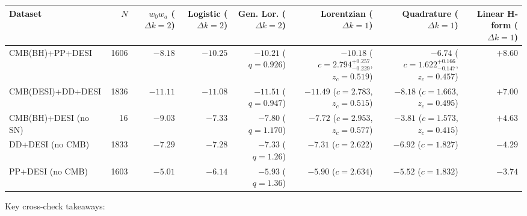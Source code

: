 \documentclass[11pt,a4paper]{article}
\begin{document}
\begin{center}
\begin{adjustbox}{max width=\linewidth}
\begin{tabular}{lrrrrrrr}
\hline
{}{\bfseries\boldmath Dataset} & {\bfseries\boldmath $N$} & {\bfseries\boldmath $w_0 w_a$ ($\Delta k=2$)} & {\bfseries\boldmath Logistic ($\Delta k=2$)} & {\bfseries\boldmath Gen. Lor. ($\Delta k=2$)} & {\bfseries\boldmath Lorentzian ($\Delta k=1$)} & {\bfseries\boldmath Quadrature ($\Delta k=1$)} & {\bfseries\boldmath Linear H-form ($\Delta k=1$)} \\
\hline
{}CMB(BH)+PP+DESI & 1606 & $-8.18$ & $-10.25$ & $-10.21$ ($q=0.926$) & $-10.18$ ($c=2.794^{+0.257}_{-0.229}$, $z_c=0.519$) & $-6.74$ ($c=1.622^{+0.166}_{-0.147}$, $z_c=0.457$) & $+8.60$ \\
{}CMB(DESI)+DD+DESI & 1836 & $-11.11$ & $-11.08$ & $-11.51$ ($q=0.947$) & $-11.49$ ($c=2.783$, $z_c=0.515$) & $-8.18$ ($c=1.663$, $z_c=0.495$) & $+7.00$ \\
{}CMB(BH)+DESI (no SN) & 16 & $-9.03$ & $-7.33$ & $-7.80$ ($q=1.170$) & $-7.72$ ($c=2.953$, $z_c=0.577$) & $-3.81$ ($c=1.573$, $z_c=0.415$) & $+4.63$ \\
{}DD+DESI (no CMB) & 1833 & $-7.29$ & $-7.28$ & $-7.33$ ($q=1.26$) & $-7.31$ ($c=2.622$) & $-6.92$ ($c=1.827$) & $-4.29$ \\
{}PP+DESI (no CMB) & 1603 & $-5.01$ & $-6.14$ & $-5.93$ ($q=1.36$) & $-5.90$ ($c=2.634$) & $-5.52$ ($c=1.832$) & $-3.74$ \\
\hline
\end{tabular}
\end{adjustbox}
\end{center}

Key cross-check takeaways:
\end{document}
